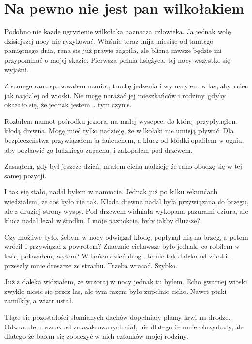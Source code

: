 \chapter{Na pewno nie jest pan wilkołakiem} 


Podobno nie każde ugryzienie wilkołaka naznacza człowieka.
Ja jednak wolę dzisiejszej nocy nie ryzykować.
Właśnie teraz mija miesiąc od tamtego pamiętnego dnia, rana się już prawie zagoiła, ale blizna zawsze będzie mi przypominać o mojej skazie.
Pierwsza pełnia księżyca, tej nocy wszystko się wyjaśni.

Z samego rana spakowałem namiot, trochę jedzenia i wyruszyłem w las, aby uciec jak najdalej od wioski.
Nie mogę narażać jej mieszkańców i rodziny, gdyby okazało się, że jednak jestem... tym czymś.

Rozbiłem namiot pośrodku jeziora, na małej wysepce, do której przypłynąłem kłodą drewna. 
Mogę mieć tylko nadzieję, że wilkołaki nie umieją pływać.
Dla bezpieczeństwa przywiązałem ją łańcuchem, a klucz od kłódki opaliłem w ogniu, aby pozbawić go ludzkiego zapachu, i zakopałem pod drzewem.

Zasnąłem, gdy był jeszcze dzień, miałem cichą nadzieję że rano obudzę się w tej samej pozycji.

\divider{}

I tak się stało, nadal byłem w namiocie. Jednak już po kilku sekundach wiedziałem, że coś było nie tak.
Kłoda drewna nadal była przywiązana do brzegu, ale z drugiej strony wyspy.
Pod drzewem widniała wykopana pazurami dziura, ale klucz nadal leżał w środku.
I moje paznokcie, były jakby dłuższe?

Czy możliwe było, żebym w nocy odwiązał kłodę, popłynął nią na brzeg, a potem wrócił i przywiązał z powrotem?
Znacznie ciekawsze było jednak, co robiłem w lesie, polowałem, wyłem? 
W końcu dzień drogi, to nie tak daleko od wioski... przeszły mnie dreszcze ze strachu.
Trzeba wracać. Szybko.

\divider{}

Już z daleka widziałem, że wczoraj w nocy jednak tu byłem.
Echo gwarnej wioski zwykle niesie się przez las, ale tym razem było zupełnie cicho.
Nawet ptaki zamilkły, a wiatr ustał.

Tlące się pozostałości słomianych dachów dopełniały plamy krwi na drodze.
Odwracałem wzrok od zmasakrowanych ciał, nie dlatego że mnie obrzydzały, ale dlatego że bałem się zobaczyć w nich członków mojej rodziny.

